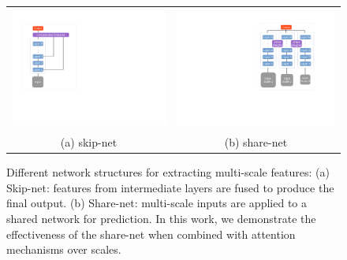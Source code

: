 \begin{figure}    
  \centering
  \addtolength{\tabcolsep}{-5pt}
  \begin{tabular}{cc}
   \includegraphics[height=0.59\linewidth]{fig/skip_net3.pdf} &
   \includegraphics[height=0.59\linewidth]{fig/share_net3.pdf} \\
   (a) skip-net &
   (b) share-net \\
  \end{tabular}
  \vspace{1pt}
  \caption{Different network structures for extracting multi-scale features: (a) Skip-net: features from intermediate layers are fused to produce the final output. (b) Share-net: multi-scale inputs are applied to a shared network for prediction. In this work, we demonstrate the effectiveness of the share-net when combined with attention mechanisms over scales.}
  \label{fig:nets}
\end{figure}  

